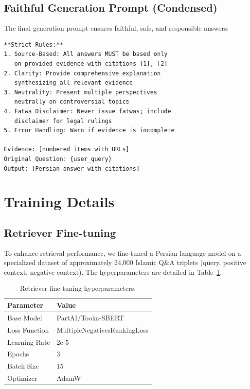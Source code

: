 \documentclass[11pt]{article}
\begin{document}
\subsection{Faithful Generation Prompt (Condensed)}

The final generation prompt ensures faithful, safe, and responsible answers:

\begin{small}
\begin{verbatim}
**Strict Rules:**
1. Source-Based: All answers MUST be based only 
   on provided evidence with citations [1], [2]
2. Clarity: Provide comprehensive explanation 
   synthesizing all relevant evidence
3. Neutrality: Present multiple perspectives 
   neutrally on controversial topics
4. Fatwa Disclaimer: Never issue fatwas; include 
   disclaimer for legal rulings
5. Error Handling: Warn if evidence is incomplete

Evidence: [numbered items with URLs]
Original Question: {user_query}
Output: [Persian answer with citations]
\end{verbatim}
\end{small}

\section{Training Details}
\label{sec:appendix-training}

\subsection{Retriever Fine-tuning}

To enhance retrieval performance, we fine-tuned a Persian language model on a specialized dataset of approximately 24,000 Islamic Q\&A triplets (query, positive context, negative context). The hyperparameters are detailed in Table~\ref{tab:retriever-hyperparams}.

\begin{table}[t]
\centering
\small
\begin{tabular}{ll}
\hline
\textbf{Parameter} & \textbf{Value} \\
\hline
Base Model & PartAI/Tooka-SBERT \\
Loss Function & MultipleNegativesRankingLoss \\
Learning Rate & 2e-5 \\
Epochs & 3 \\
Batch Size & 15 \\
Optimizer & AdamW \\
\hline
\end{tabular}
\caption{Retriever fine-tuning hyperparameters.}
\label{tab:retriever-hyperparams}
\end{table}
\end{document}
